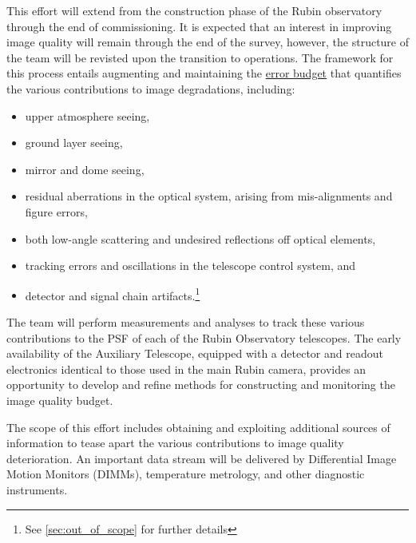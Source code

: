 \documentclass[SE,authoryear,toc]{lsstdoc}
\begin{document}
This effort will extend from the construction phase of the Rubin observatory through the end of commissioning.
It is expected that an interest in improving image quality will remain through the end of the survey, however, the structure of the team will be revisted upon the transition to operations.
The framework for this process entails augmenting and maintaining the \href{https://ls.st/Document-17258}{error budget} that quantifies the various contributions to image degradations, including:
\begin{itemize}
\item upper atmosphere seeing,
\item ground layer seeing,
\item mirror and dome seeing,
\item residual aberrations in the optical system, arising from mis-alignments and figure errors,
\item both low-angle scattering and undesired reflections off optical elements,
\item tracking errors and oscillations in the telescope control system, and
\item detector and signal chain artifacts.\footnote{See \ref{sec:out_of_scope} for further details}
\end{itemize}

The team will perform measurements and analyses to track these various contributions to the PSF of each of the Rubin Observatory telescopes.
The early availability of the Auxiliary Telescope, equipped with a detector and readout electronics identical to those used in the main Rubin camera, provides an opportunity to develop and refine methods for constructing and monitoring the image quality budget.

The scope of this effort includes obtaining and exploiting additional sources of information to tease apart the various contributions to image quality deterioration.
An important data stream will be delivered by Differential Image Motion Monitors (DIMMs), temperature metrology, and other diagnostic instruments.
\end{document}
